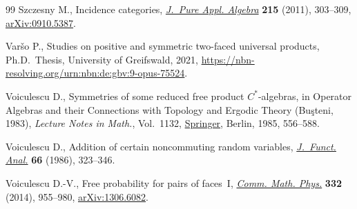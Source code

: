\documentclass[pdftex]{sigma}
\numberwithin{equation}{section}
\begin{document}
\begin{thebibliography}{99}
Szczesny M., Incidence categories, \href{https://doi.org/10.1016/j.jpaa.2010.04.020}{\textit{J.~Pure Appl. Algebra}} \textbf{215}
 (2011), 303--309, \href{https://arxiv.org/abs/0910.5387}{arXiv:0910.5387}.

Var\v{s}o P., Studies on positive and symmetric two-faced universal products,
 Ph.D.~Thesis, {U}niversity of Greifswald, 2021,
 \url{https://nbn-resolving.org/urn:nbn:de:gbv:9-opus-75524}.

Voiculescu D., Symmetries of some reduced free product {$C^\ast$}-algebras, in
 Operator Algebras and their Connections with Topology and Ergodic Theory
 ({B}u\c{s}teni, 1983), \textit{Lecture Notes in Math.}, Vol.~1132, \href{https://doi.org/10.1007/BFb0074909}{Springer},
 Berlin, 1985, 556--588.

Voiculescu D., Addition of certain noncommuting random variables,
 \href{https://doi.org/10.1016/0022-1236(86)90062-5}{\textit{J.~Funct. Anal.}} \textbf{66} (1986), 323--346.

Voiculescu D.-V., Free probability for pairs of faces~{I}, \href{https://doi.org/10.1007/s00220-014-2060-7}{\textit{Comm. Math.
 Phys.}} \textbf{332} (2014), 955--980, \href{https://arxiv.org/abs/1306.6082}{arXiv:1306.6082}.

\end{thebibliography}\LastPageEnding
\end{document}
